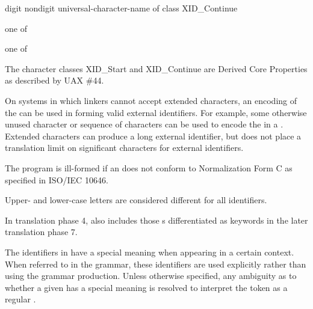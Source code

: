 \begin{bnf}
\br
    digit\br
    nondigit\br
    universal-character-name \textnormal{of class XID_Continue}
\end{bnf}

\begin{bnf}
 \textnormal{one of}\br
    \br
    \br
    \br
\end{bnf}

\begin{bnf}
 \textnormal{one of}\br
\end{bnf}

\pnum
{}%
%
The character classes XID_Start and XID_Continue
are Derived Core Properties as described by UAX \#44.
\begin{footnote}
On systems in which linkers cannot accept extended
characters, an encoding of the  can be used in
forming valid external identifiers. For example, some otherwise unused
character or sequence of characters can be used to encode the
 in a . Extended
characters can produce a long external identifier, but \Cpp{} does not
place a translation limit on significant characters for external
identifiers.
\end{footnote}
The program is ill-formed
if an  does not conform to
Normalization Form C as specified in ISO/IEC 10646.
\begin{note}
Upper- and lower-case letters are considered different for all identifiers.
\end{note}
\begin{note}
In translation phase 4,
 also includes
those s
differentiated as keywords
in the later translation phase 7.
\end{note}

\pnum
{}%
%
%
%
The identifiers in  have a special meaning when
appearing in a certain context. When referred to in the grammar, these identifiers
are used explicitly rather than using the  grammar production.
Unless otherwise specified, any ambiguity as to whether a given
 has a special meaning is resolved to interpret the
token as a regular .

